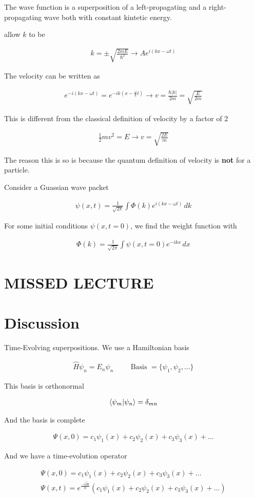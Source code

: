 \documentclass[fleqn]{report}
\newcommand{\hp}{\hspace{1cm}}
\newcommand{\equations} [1] {
\begin{gather*}
#1
\end{gather*}
}
\begin{document}
The wave function is a superposition of a left-propagating and a 
right-propagating wave both with constant kintetic energy.

allow $k$ to be
\equations{
    k 
    =
    \pm 
    \sqrt{\frac{2mE}{\hbar^2}}
    \rightarrow 
    A e^{i(kx - \omega t)}
}

The velocity can be written as 
\equations{
    e^{-i(kx - \omega t)}
    =
    e^{-ik(x - \frac{\omega}{k} t)}
    \rightarrow 
    v 
    =
    \frac{\hbar |k|}{2m}
    =
    \sqrt{\frac{E}{2m}}
}

This is different from the classical definition of velocity by a factor of 2
\equations{
    \frac{1}{2} mv^2 = E 
    \rightarrow 
    v 
    =
    \sqrt{\frac{2E}{m}}
}
The reason this is so is because the quantum definition of velocity 
is \textbf{not} for a particle.

Consider a Guassian wave packet 
\equations{
    \psi(x, t)
    =
    \frac{1}{\sqrt{2 \pi}}
    \int 
    \Phi(k)
    e^{i(kx - \omega t)}
    \, dk
}
For some initial conditions $\psi(x, t=0)$, we find the weight function with 

\equations{
    \Phi(k)
    =
    \frac{1}{\sqrt{2 \pi}}
    \int 
    \psi(x, t=0)
    e^{-ikx}
    \, dx 
}

\section{MISSED LECTURE}

\section{Discussion}
Time-Evolving superpositions. We use a Hamiltonian basis 
\equations{
    \hat H \psi_n 
    =
    E_n \psi_n 
    \hp 
    \textrm{Basis }
    =
    \{
        \psi_1, \psi_2, \ldots
    \}
}

This basis is orthonormal 
\equations{
    \bra{\psi_m} \ket{\psi_n} = \delta_{mn}
}

And the basis is complete 
\equations{
    \Psi(x, 0)
    =
    c_1 \psi_1(x)
    +
    c_2 \psi_2(x)
    +
    c_3 \psi_3(x)
    +
    \ldots
}

And we have a time-evolution operator 

\equations{
    \Psi(x, 0)
    =
    c_1 \psi_1(x)
    +
    c_2 \psi_2(x)
    +
    c_3 \psi_3(x)
    +
    \ldots
    \\
    \Psi(x, t)
    =
    e^{\frac{-i \hat H t}{\hbar}}
    \left(
    c_1 \psi_1(x)
    +
    c_2 \psi_2(x)
    +
    c_3 \psi_3(x)
    +
    \ldots
    \right)
}
\end{document}
